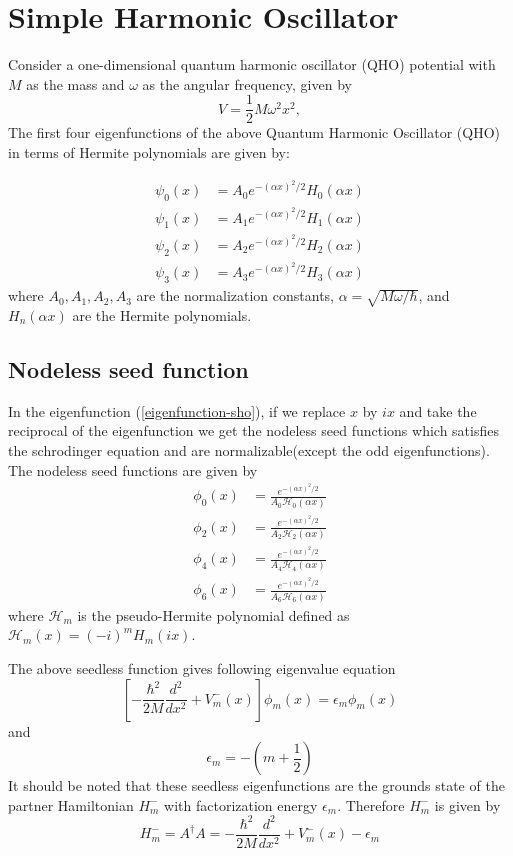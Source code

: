 \documentclass[a4paper, 12pt]{article}
\begin{document}
\section{Simple Harmonic Oscillator}
Consider a one-dimensional quantum harmonic oscillator (QHO) potential with \( M \) as the mass and \( \omega \) as the angular frequency, given by
\begin{equation}\label{sho-potential}
V = \frac{1}{2} M \omega^2 x^2,
\end{equation}
The first four eigenfunctions of the above Quantum Harmonic Oscillator (QHO) in terms of Hermite polynomials are given by:

\begin{align}\label{eigenfunction-sho}
\psi_0(x) &= A_0 e^{-(\alpha x)^2/2} H_0(\alpha x) \\
\psi_1(x) &= A_1 e^{-(\alpha x)^2/2} H_1(\alpha x) \\
\psi_2(x) &= A_2 e^{-(\alpha x)^2/2} H_2(\alpha x) \\
\psi_3(x) &= A_3 e^{-(\alpha x)^2/2} H_3(\alpha x)
\end{align}
where \( A_0, A_1, A_2, A_3 \) are the normalization constants, \( \alpha = \sqrt{M\omega/\hbar} \), and \( H_n(\alpha x) \) are the Hermite polynomials.

\subsection{Nodeless seed function}
In the eigenfunction (\ref{eigenfunction-sho}), if we replace $x$ by $i x$ and take the reciprocal of the eigenfunction we get the nodeless seed functions which satisfies the schrodinger equation and are normalizable(except the odd eigenfunctions). The nodeless seed functions are given by
\begin{align}
    \phi_0(x) &= \frac{e^{-(\alpha x)^2/2}}{A_0 \mathcal{H}_0(\alpha x)} \\
    \phi_2(x) &= \frac{e^{-(\alpha x)^2/2}}{A_2 \mathcal{H}_2(\alpha x)} \\
    \phi_4(x) &= \frac{e^{-(\alpha x)^2/2}}{A_4 \mathcal{H}_4(\alpha x)} \\
    \phi_6(x) &=  \frac{e^{-(\alpha x)^2/2}}{A_6 \mathcal{H}_6(\alpha x)}
\end{align}
where $\mathcal{H}_m$ is the pseudo-Hermite polynomial defined as $\mathcal{H}_m(x) = (-i)^m H_m(ix)$.

The above seedless function gives following eigenvalue equation
\begin{equation}
    \left[-\frac{\hbar^2}{2M}\frac{d^2}{dx^2} + V^-_m(x)\right]\phi_m(x) = \epsilon_m \phi_m(x)
\end{equation}
and \[\epsilon_m=-\left(m+\frac{1}{2}\right)\]
It should be noted that these seedless eigenfunctions are the grounds state of the partner Hamiltonian \( H^-_m \) with factorization energy \( \epsilon_m \).
Therefore \( H^-_m \) is given by
\begin{equation}
H^-_m = A^\dagger A = -\frac{\hbar^2}{2M}\frac{d^2}{dx^2} + V^-_m(x)-\epsilon_m
\end{equation}
\end{document}

